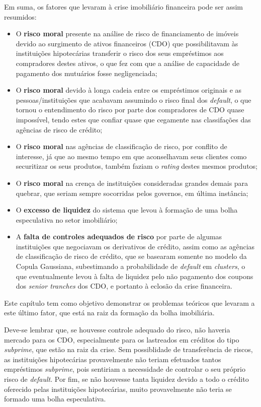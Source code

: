 \documentclass[
	12pt,				%
	oneside,			%
	a4paper,			%
	chapter=TITLE,		%
	section=TITLE,		%
	english,			%
	brazil				%
	]{abntex2}
\begin{document}
Em suma, os fatores que levaram à crise imobiliário financeira pode ser assim
resumidos:
\begin{itemize}
\item
  O \textbf{risco moral} presente na análise de risco de financiamento de imóveis
  devido ao surgimento de ativos financeiros (\gls{CDO}) que possibilitavam às
  instituições hipotecárias transferir o risco dos seus empréstimos aos
  compradores destes ativos, o que fez com que a análise de capacidade de
  pagamento dos mutuários fosse negligenciada;
\item
  O \textbf{risco moral} devido à longa cadeia entre os empréstimos originais e as
  pessoas/instituições que acabavam assumindo o risco final dos \emph{default}, o que
  tornou o entendimento do risco por parte dos compradores de \gls{CDO} quase
  impossível, tendo estes que confiar quase que cegamente nas classifações das
  agências de risco de crédito;
\item
  O \textbf{risco moral} nas agências de classificação de risco, por conflito de
  interesse, já que ao mesmo tempo em que aconselhavam seus clientes como
  securitizar os seus produtos, também faziam o \emph{rating} destes mesmos produtos;
\item
  O \textbf{risco moral} na crença de instituições consideradas grandes demais para
  quebrar, que seriam sempre socorridas pelos governos, em última instância;
\item
  O \textbf{excesso de liquidez} do sistema que levou à formação de uma bolha
  especulativa no setor imobiliário;
\item
  A \textbf{falta de controles adequados de risco} por parte de algumas instituições
  que negociavam os derivativos de crédito, assim como as agências de
  classificação de risco de crédito, que se basearam somente no modelo da Copula
  Gaussiana, subestimando a probabilidade de \emph{default} em \emph{clusters}, o que
  eventualmente levou à falta de liquidez pelo não pagamento dos coupons dos
  \emph{senior tranches} dos \gls{CDO}, e portanto à eclosão da crise financeira.
\end{itemize}
Este capítulo tem como objetivo demonstrar os problemas teóricos que levaram
a este último fator, que está na raiz da formação da bolha imobiliária.

Deve-se lembrar que, se houvesse controle adequado do risco, não haveria mercado
para os \gls{CDO}, especialmente para os lastreados em créditos do tipo
\emph{subprime}, que estão na raiz da crise. Sem possiblidade de transferência de
riscos, as instituições hipotecárias provavelmente não teriam efetuados tantos
empréstimos \emph{subprime}, pois sentiriam a necessidade de controlar o seu próprio
risco de \emph{default}. Por fim, se não houvesse tanta liquidez devido a todo o
crédito oferecido pelas instituições hipotecárias, muito provavelmente não teria
se formado uma bolha especulativa.
\end{document}
